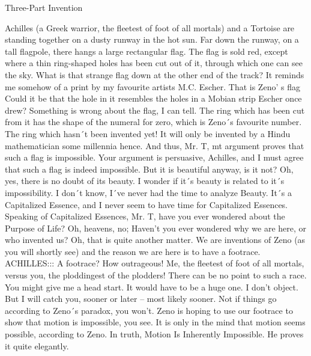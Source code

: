
                                   Three-Part Invention

           Achilles (a Greek warrior, the fleetest of foot of all mortals) and a Tortoise are
           standing together on a dusty runway in the hot sun. Far down the runway, on a
           tall flagpole, there hangs a large rectangular flag. The flag is sold red, except
           where a thin ring-shaped holes has been cut out of it, through which one can see
           the sky.
\achilles What is that strange flag down at the other end of the track? It reminds me
     somehow of a print by my favourite artists M.C. Escher.
\tortoise That is Zeno’ s flag
\achilles Could it be that the hole in it resembles the holes in a Mobian strip Escher once
     drew? Something is wrong about the flag, I can tell.
\tortoise The ring which has been cut from it has the shape of the numeral for zero, which
     is Zeno´s favourite number.
\achilles The ring which hasn´t been invented yet! It will only be invented by a Hindu
     mathematician some millennia hence. And thus, Mr. T, mt argument proves that such a
     flag is impossible.
\tortoise Your argument is persuasive, Achilles, and I must agree that such a flag is indeed
     impossible. But it is beautiful anyway, is it not?
\achilles Oh, yes, there is no doubt of its beauty.
\tortoise I wonder if it´s beauty is related to it´s impossibility. I don´t know, I´ve never had
     the time to analyze Beauty. It´s a Capitalized Essence, and I never seem to have time for
     Capitalized Essences.
\achilles Speaking of Capitalized Essences, Mr. T, have you ever wondered about the
     Purpose of Life?
\tortoise Oh, heavens, no;
\achilles Haven’t you ever wondered why we are here, or who invented us?
\tortoise Oh, that is quite another matter. We are inventions of Zeno (as you will shortly
     see) and the reason we are here is to have a footrace.
ACHILLES::: A footrace? How outrageous! Me, the fleetest of foot of all mortals, versus you,
     the ploddingest of the plodders! There can be no point to such a race.
\tortoise You might give me a head start.
\achilles It would have to be a huge one.
\tortoise I don’t object.
\achilles But I will catch you, sooner or later – most likely sooner.
\tortoise Not if things go according to Zeno´s paradox, you won’t. Zeno is hoping to use
     our footrace to show that motion is impossible, you see. It is only in the mind that motion
     seems possible, according to Zeno. In truth, Motion Is Inherently Impossible. He proves
     it quite elegantly.




